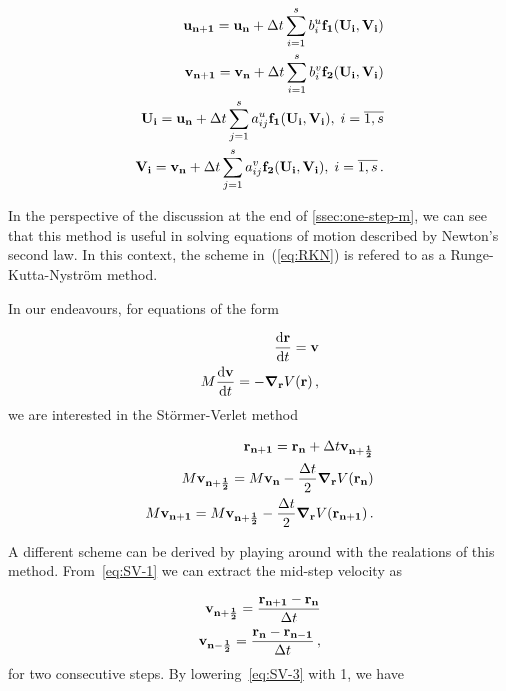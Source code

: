 \documentclass[12pt, class=report, crop=false]{standalone}
\begin{document}
\begin{subequations}
  \label{eq:RKN}
  \begin{align}
    \vb{u_{n+1}} = \vb{u_n} + \Delta t \sum_{i=1}^s b_i^u \vb{f_1}(\vb{U_i}, \vb{V_i}) \\
    \vb{v_{n+1}} = \vb{v_n} + \Delta t \sum_{i=1}^s b_i^v \vb{f_2}(\vb{U_i}, \vb{V_i}) \\
    \vb{U_i} = \vb{u_n} + \Delta t \sum_{j=1}^s a_{ij}^u \vb{f_1}(\vb{U_i}, \vb{V_i}),\; i = \overline{1,s}\\
    \vb{V_i} = \vb{v_n} + \Delta t \sum_{j=1}^s a_{ij}^v \vb{f_2}(\vb{U_i}, \vb{V_i}),\; i = \overline{1,s}\,.
  \end{align}
\end{subequations}

In the perspective of the discussion at the end of \cref{ssec:one-step-m}, we can see that this method is useful in solving equations of motion described by Newton's second law. In this context, the scheme in~(\ref{eq:RKN}) is refered to as a Runge-Kutta-Nyström method.

In our endeavours, for equations of the form

\begin{subequations}
  \begin{align}
    \dv{\vb{r}}{t} = \vb{v}\\
    M\dv{\vb{v}}{t} = - \grad_{\vb{r}} V(\vb{r})\,,
  \end{align}
\end{subequations}
we are interested in the Störmer-Verlet method

\begin{subequations}
  \begin{align}
    \label{eq:SV-1}
    \vb{r_{n+1}} = \vb{r_n} +\Delta t \vb{v_{n+\frac{1}{2}}}\\
    \label{eq:SV-2}
    M\vb{v_{n+\frac{1}{2}}} = M\vb{v_n} - \frac{\Delta t}{2} \grad_{\vb{r}} V(\vb{r_n})\\
    \label{eq:SV-3}
    M\vb{v_{n+1}} = M\vb{v_{n+\frac{1}{2}}} - \frac{\Delta t}{2} \grad_{\vb{r}} V(\vb{r_{n+1}})\,.
  \end{align}
\end{subequations}

A different scheme can be derived by playing around with the realations of this method. From~\cref{eq:SV-1} we can extract the mid-step velocity as

\begin{subequations}
  \label{eq:mid-step-v}
  \begin{align}
    \vb{v_{n+\frac{1}{2}}} = \frac{\vb{r_{n+1}} - \vb{r_n}}{\Delta t}\\
    \vb{v_{n-\frac{1}{2}}} = \frac{\vb{r_n} - \vb{r_{n-1}}}{\Delta t}\,,
  \end{align}
\end{subequations}
for two consecutive steps. By lowering~\cref{eq:SV-3} with 1, we have
\end{document}
